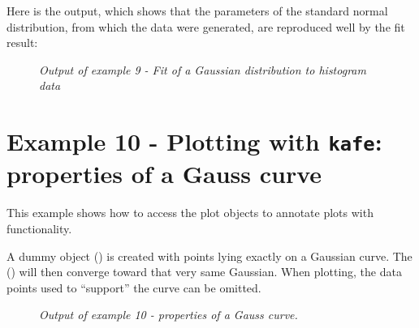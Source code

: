 \documentclass[a4paper,10pt,english]{sphinxmanual}
\begin{document}
Here is the output, which shows that the parameters of the
standard normal distribution, from which the data were generated,
are reproduced well by the fit result:
\begin{figure}[htbp]
\centering
\capstart

\caption{\emph{Output of example 9 - Fit of a Gaussian distribution to histogram data}}\end{figure}


\section{Example 10 - Plotting with \texttt{kafe}: properties of a Gauss curve}
\label{index:example-10-plotting-with-kafe-properties-of-a-gauss-curve}
This example shows how to access the  plot objects
to annotate plots with  functionality.

A dummy object {\hyperref[index:kafe.dataset.Dataset]{\emph{}}} () is
created with points lying exactly on a Gaussian curve.
The {\hyperref[index:kafe.fit.Fit]{\emph{}}} () will then converge toward
that very same Gaussian. When plotting, the data points
used to ``support'' the curve can be omitted.
\begin{figure}[htbp]
\centering
\capstart

\caption{\emph{Output of example 10 - properties of a Gauss curve.}}\end{figure}
\end{document}
